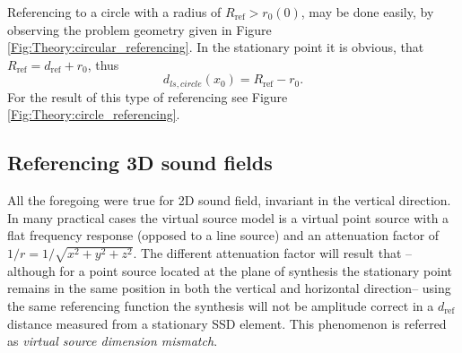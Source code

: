 \documentclass[12pt,a4paper]{article}
\newcommand{\dref}{d_{\mathrm{ref}}}
\begin{document}
Referencing to a circle with a radius of $R_{\mathrm{ref}} > r_0(0)$, may be done easily, by observing the problem geometry given in Figure \ref{Fig:Theory:circular_referencing}. 
In the stationary point it is obvious, that $R_{\mathrm{ref}} = \dref + r_0$, thus
\begin{equation}
d_{ls,circle}(x_0) = R_{\mathrm{ref}} - r_0.
\end{equation}
For the result of this type of referencing see Figure \ref{Fig:Theory:circle_referencing}.


\subsection{Referencing 3D sound fields}

All the foregoing were true for 2D sound field, invariant in the vertical direction. In many practical cases the virtual source model is a virtual point source with a flat frequency response (opposed to a line source) and an attenuation factor of $1/r = 1/\sqrt{x^2+y^2+z^2}$. The different attenuation factor will result that --although for a point source located at the plane of synthesis the stationary point remains in the same position in both the vertical and horizontal direction-- using the same referencing function the synthesis will not be amplitude correct in a $\dref$ distance measured from a stationary SSD element. This phenomenon is referred as \emph{virtual source dimension mismatch}.
\end{document}
